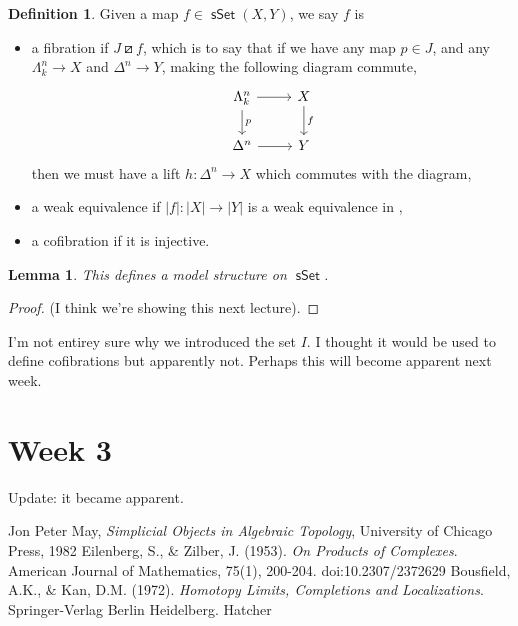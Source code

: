 \documentclass{amsart}
\newcommand{\catname}[1]{{\sffamily\upshape{{#1}}}}
\newcommand{\topp}{\catname{Top}}
\DeclareMathOperator{\msset}{\mathsf{sSet}}
\newtheorem{lemma}[theorem]{Lemma}
\theoremstyle{definition}
\newtheorem{definition}[theorem]{Definition}
\begin{document}
\begin{definition}
  Given a map $f\in \msset (X,Y)$, we say $f$ is
  \begin{itemize}
  \item a fibration if $J \boxslash f$, which is to say that if
    we have any map $p\in J$, and any $\Lambda^n_k \to X$
    and $\Delta^n \to Y$, making the following diagram commute,
    \[
    \begin{tikzcd}
      \Lambda^n_k \arrow[r] \arrow[d, "p"] & X \arrow[d, "f"] \\
      \Delta^n \arrow[r] &Y
    \end{tikzcd}
  \]
  then we must have a lift $h: \Delta^n \to X$ which commutes with the diagram,
\item a weak equivalence if $|f|: |X|\to |Y|$ is a weak equivalence in
  \topp,
\item a cofibration if it is injective.
\end{itemize}
\end{definition}
\begin{lemma}
  This defines a model structure on $\msset$.
\end{lemma}
\begin{proof}
  (I think we're showing this next lecture).
\end{proof}
I'm not entirey sure why we introduced the set $I$. I thought it would be used
to define cofibrations but apparently not. Perhaps this will become
apparent next week.

\section{Week 3}
Update: it became apparent.



\begin{thebibliography}{10}
 Jon Peter May, {\it Simplicial Objects in Algebraic Topology}, University of Chicago Press, 1982
 Eilenberg, S., \& Zilber, J. (1953). {\it On Products of Complexes}. American Journal of Mathematics, 75(1), 200-204. doi:10.2307/2372629
 Bousfield, A.K., \& Kan, D.M. (1972). {\it Homotopy Limits, Completions and Localizations}. Springer-Verlag Berlin Heidelberg.
 Hatcher
\end{thebibliography} 




\end{document}
